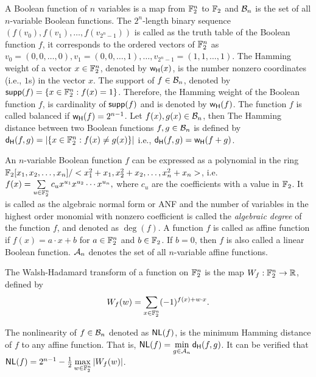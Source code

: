 \documentclass{llncs}
\begin{document}
A Boolean function of $n$ variables is a map from $\mathbb{F}_2^n$ to $\mathbb{F}_2$ and $\mathcal{B}_n$ is the set of all $n$-variable Boolean functions. 
The $2^n$-length binary sequence $(f(v_0), f(v_1), \ldots, f(v_{2^n-1}))$ is called as the truth table of the Boolean function $f$, it corresponds to the ordered vectors of $\mathbb{F}_2^n$ as $v_0 = (0,0,\ldots,0), v_1= (0,0,\ldots,1),\ldots, v_{2^n-1}=(1,1,\ldots,1)$. 
The Hamming weight of a vector $x \in \mathbb{F}_2^n$, denoted by $\mathsf{w_H}(x)$, is the number nonzero coordinates (i.e., $1$s) in the vector $x$. The support of $f \in \mathcal{B}_n$, denoted by $\mathsf{supp}(f)= \{x \in \mathbb{F}_2^n : f(x) = 1\}$. Therefore, the Hamming weight of the Boolean function $f$, is cardinality of $\mathsf{supp}(f)$ and is denoted by $\mathsf{w_H}(f)$. The function $f$ is called balanced if $\mathsf{w_H}(f)= 2^{n-1}$. Let $f(x), g(x) \in \mathcal{B}_n$, then 
The Hamming distance between two Boolean functions $f, g \in \mathcal{B}_n$ is defined by $\mathsf{d_H}(f,g) = |\{x \in \mathbb{F}_2^n : f(x) \neq g(x) \}|$  i.e., $\mathsf{d_H}(f,g) = \mathsf{w_H}(f + g)$.

An $n$-variable Boolean function $f$ can be expressed as a polynomial in the ring $\mathbb{F}_2[x_1,x_2,\ldots,x_n]/<x_1^2+x_1,x_2^2+x_2,\ldots,x_n^2+x_n>$, i.e. 
$f(x) = \sum\limits_{u \in \mathbb{F}_2^n}c_u x^{u_1}x^{u_2}\cdots x^{u_n},$
where $c_u$ are the coefficients with a value in $\mathbb{F}_2$.
It is called as the algebraic normal form or ANF and the number of variables in the highest order monomial with nonzero coefficient is called the \textit{algebraic degree} of the function $f$, and denoted as $\deg(f)$.
A function $f$ is called as affine function if $f(x)= a\cdot x + b$ for $a \in \mathbb{F}_2^n$ and $b \in \mathbb{F}_2$. If $b=0$, then $f$ is also called a linear Boolean function. $\mathcal{A}_n$ denotes the set of all $n$-variable affine functions. 

\begin{definition}\label{def:Walsh}
The Walsh-Hadamard transform of a function on $\mathbb{F}_2^n$ is the map $W_f : \mathbb{F}_2^n \to \mathbb{R}$, defined by \[W_{f}(w)= \sum_{x \in \mathbb{F}_2^n} (-1)^{f(x)+ w \cdot x}.\]
\end{definition}

\begin{definition}[Nonlinearity]\label{def:Nonlinearity}
The nonlinearity of $f \in \mathcal{B}_n$ denoted as $\mathsf{NL}(f)$, is the minimum Hamming distance of $f$ to any affine function. That is, $\mathsf{NL}(f) = \min\limits_{g \in \mathcal{A}_n} \mathsf{d_H}(f,g)$.
It can be verified that $\mathsf{NL}(f) = 2^{n-1} - \frac{1}{2}\max\limits_{w \in \mathbb{F}_2^n} |W_{f}(w)|$.
\end{definition}
\end{document}
